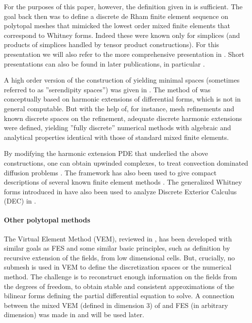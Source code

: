 \documentclass[10pt,a4paper]{article}
\theoremstyle{remark}
\theoremstyle{definition}
\numberwithin{equation}{section}
\begin{document}
For the purposes of this paper, however, the definition given in \cite{Chr08M3AS} is sufficient. The goal back then was to define a discrete de Rham finite element sequence on polytopal meshes that mimicked the lowest order mixed finite elements that correspond to Whitney forms. Indeed these were known only for simplices (and products of simplices handled by tensor product constructions). For this presentation we will also refer to the more comprehensive presentation in \cite[\S 5]{ChrMunOwr11}. Short presentations can also be found in later publications, in particular \cite[\S 2]{ChrRap16}.

A high order version of the construction of \cite{Chr08M3AS} yielding minimal spaces (sometimes referred to as ''serendipity spaces'') was given in \cite{Chr10CRAS, ChrGil16}. The method of \cite{Chr08M3AS, ChrGil16} was conceptually based on harmonic extensions of differential forms, which is not in general computable. But with the help of, for instance, mesh refinements and known discrete spaces on the refinement, adequate discrete harmonic extensions were defined, yielding ''fully discrete'' numerical methods with algebraic and analytical properties identical with those of standard mixed finite elements.

By modifying the harmonic extension PDE that underlied the above constructions, one can obtain upwinded complexes, to treat convection dominated diffusion problems \cite{Chr13FoCM,ChrHalSor14}. The framework has also been used to give compact descriptions of several known finite element methods \cite{ChrGil16, ChrRap16}. The generalized Whitney forms introduced in \cite{Chr08M3AS} have also been used to analyze Discrete Exterior Calculus (DEC) in \cite{GuzPot25}.

\paragraph{Other polytopal methods} The Virtual Element Method (VEM), reviewed in \cite{BeiBreMarRus23}, has been developed with similar goals as FES and some similar basic principles, such as definition by recursive extension of the fields, from low dimensional cells. But, crucially, no submesh is used in VEM to define the discretization spaces or the numerical method. The challenge is to reconstruct enough information on the fields from the degrees of freedom, to obtain stable and consistent approximations of the bilinear forms defining the partial differential equation to solve. A connection between the mixed VEM (defined in dimension 3) of \cite{BeiBreMarRus16} and FES (in arbitrary dimension) was made in \cite[\S 2.1]{ChrGil16} and will be used later.  
\end{document}
